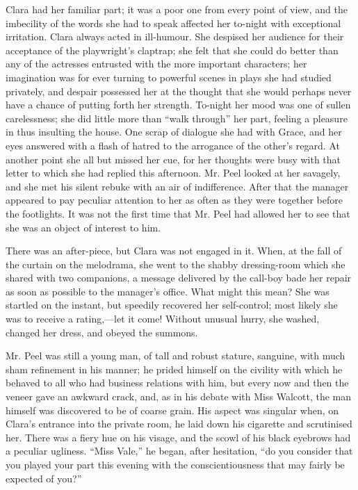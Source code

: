 Clara had her familiar part; it was a poor one from every point of view,
and the imbecility of the words she had to speak affected her to-night
with exceptional irritation. Clara always acted in ill-humour. She
despised her audience for their acceptance of the playwright's claptrap;
she felt that she could do better than any of the actresses entrusted
with the more important characters; her imagination was for ever turning
to powerful scenes in plays she had studied privately, and despair
possessed her at the thought that she would perhaps never have a chance
of putting forth her strength. To-night her mood was one of sullen
carelessness; she did little more than ``walk through'' her part,
feeling a pleasure in thus insulting the house. One scrap of dialogue
she had with Grace, and her eyes answered with a flash of hatred to the
arrogance of the other's regard. At another point she all but missed her
cue, for her thoughts {\protect\hypertarget{205}{}{}}were busy with that
letter to which she had replied this afternoon. Mr. Peel looked at her
savagely, and she met his silent rebuke with an air of indifference.
After that the manager appeared to pay peculiar attention to her as
often as they were together before the footlights. It was not the first
time that Mr. Peel had allowed her to see that she was an object of
interest to him.

There was an after-piece, but Clara was not engaged in it. When, at the
fall of the curtain on the melodrama, she went to the shabby
dressing-room which she shared with two companions, a message delivered
by the call-boy bade her repair as soon as possible to the manager's
office. What might this mean? She was startled on the instant, but
speedily recovered her self-control; most likely she was to receive a
rating,---let it come! Without unusual hurry, she washed, changed her
dress, and obeyed the summons.

Mr. Peel was still a young man, of tall and robust stature, sanguine,
with much sham refinement in his manner; he prided himself on
{\protect\hypertarget{206}{}{}}the civility with which he behaved to all
who had business relations with him, but every now and then the veneer
gave an awkward crack, and, as in his debate with Miss Walcott, the man
himself was discovered to be of coarse grain. His aspect was singular
when, on Clara's entrance into the private room, he laid down his
cigarette and scrutinised her. There was a fiery hue on his visage, and
the scowl of his black eyebrows had a peculiar ugliness. ``Miss Vale,''
he began, after hesitation, ``do you consider that you played your part
this evening with the conscientiousness that may fairly be expected of
you?''

